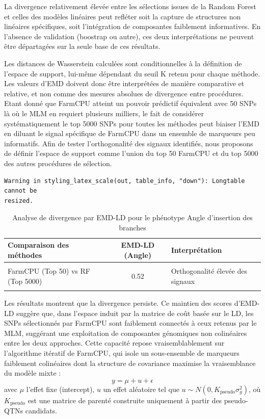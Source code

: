 \documentclass[
  11pt,
  letterpaper,
  DIV=11,
  numbers=noendperiod]{scrartcl}
\begin{document}
La divergence relativement élevée entre les sélections issues de la
Random Forest et celles des modèles linéaires peut refléter soit la
capture de structures non linéaires spécifiques, soit l'intégration de
composantes faiblement informatives. En l'absence de validation
(boostrap ou autre), ces deux interprétations ne peuvent être
départagées sur la seule base de ces résultats.

Les distances de Wasserstein calculées sont conditionnelles à la
définition de l'espace de support, lui-même dépendant du seuil K retenu
pour chaque méthode. Les valeurs d'EMD doivent donc être interprétées de
manière comparative et relative, et non comme des mesures absolues de
divergence entre procédures. Etant donné que FarmCPU atteint un pouvoir
prédictif équivalent avec 50 SNPs là où le MLM en requiert plusieurs
milliers, le fait de considérer systématiquement le top 5000 SNPs pour
toutes les méthodes peut biaiser l'EMD en diluant le signal spécifique
de FarmCPU dans un ensemble de marqueurs peu informatifs. Afin de tester
l'orthogonalité des signaux identifiés, nous proposons de définir
l'espace de support comme l'union du top 50 FarmCPU et du top 5000 des
autres procédures de sélection.

\begin{verbatim}
Warning in styling_latex_scale(out, table_info, "down"): Longtable cannot be
resized.
\end{verbatim}

\begin{longtable}[t]{>{\raggedright\arraybackslash}p{6cm}cl}
\caption{Analyse de divergence par EMD-LD pour le phénotype Angle d'insertion des branches}\\
\toprule
\textbf{Comparaison des méthodes} & \textbf{EMD-LD (Angle)} & \textbf{Interprétation}\\
\midrule
\cellcolor{gray!10}{FarmCPU (Top 50) vs MLM (Top 5000)} & \cellcolor{gray!10}{0.53} & \cellcolor{gray!10}{Orthogonalité élevée des signaux}\\
FarmCPU (Top 50) vs RF (Top 5000) & 0.52 & Orthogonalité élevée des signaux\\
\cellcolor{gray!10}{MLM (Top 5000) vs RF (Top 5000)} & \cellcolor{gray!10}{0.17} & \cellcolor{gray!10}{Consensus}\\
\bottomrule
\end{longtable}

Les résultats montrent que la divergence persiste. Ce maintien des
scores d'EMD-LD suggère que, dans l'espace induit par la matrice de coût
basée sur le LD, les SNPs sélectionnés par FarmCPU sont faiblement
connectés à ceux retenus par le MLM, suggérant une exploitation de
composantes génomiques non colinéaires entre les deux approches. Cette
capacité repose vraisemblablement sur l'algorithme itératif de FarmCPU,
qui isole un sous-ensemble de marqueurs faiblement colinéaires dont la
structure de covariance maximise la vraisemblance du modèle mixte :
\[y = \mu + u + \epsilon\] avec \(\mu\) l'effet fixe (intercept), \(u\)
un effet aléatoire tel que
\(u \sim N(0, K_{\text{pseudo}} \sigma_g^2)\), où \(K_{\text{pseudo}}\)
est une matrice de parenté construite uniquement à partir des
pseudo-QTNs candidats.
\end{document}
